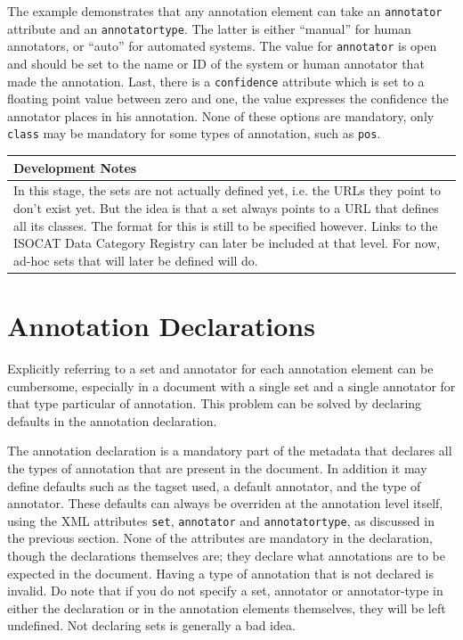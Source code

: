 \documentclass[a4paper,12pt]{report}
\newenvironment{devnotes}
{
\begin{center}
    \begin{tabular}[h!]{|p{0.8\textwidth}|}
    \hline
    {\bf Development Notes}\\\hline}
{   \\\hline
    \end{tabular}
\end{center}}
\begin{document}
The example demonstrates that any annotation element can take an \texttt{annotator} attribute and an \texttt{annotatortype}. The latter is either ``manual'' for human annotators, or ``auto'' for automated systems.  The value for \texttt{annotator} is open and should be set to the name or ID of the system or human annotator that made the annotation. Last, there is a \texttt{confidence} attribute which is set to a floating point value between zero and one, the value expresses the confidence the annotator places in his annotation. None of these options are mandatory, only \texttt{class} may be mandatory for some types of annotation, such as \texttt{pos}.

\begin{devnotes}
In this stage, the sets are not actually defined yet, i.e. the URLs they point to don't exist yet. But the idea is that a set always points to a URL that defines all its classes. The format for this is still to be specified however. Links to the ISOCAT Data Category Registry can later be included at that level. For now, ad-hoc sets that will later be defined will do.
\end{devnotes}


\section{Annotation Declarations}

Explicitly referring to a set and annotator for each annotation element can be cumbersome, especially in a document with a single set and a single annotator for that type particular of annotation. This problem can be solved by declaring defaults in the annotation declaration.

The annotation declaration is a mandatory part of the metadata that declares all the types of annotation that are present in the document. In addition it may define defaults such as the tagset used, a default annotator, and the type of annotator. These defaults can always be overriden at the annotation level itself, using the XML attributes \texttt{set}, \texttt{annotator} and \texttt{annotatortype}, as discussed in the previous section. None of the attributes are mandatory in the declaration, though the declarations themselves are; they declare what annotations are to be expected in the document. Having a type of annotation that is not declared is invalid. Do note that if you do not specify a set, annotator or annotator-type in either the declaration or in the annotation elements themselves, they will be left undefined. Not declaring sets is generally a bad idea.  
\end{document}
